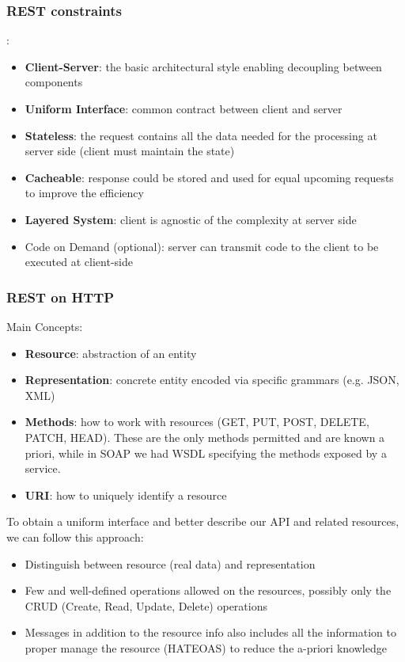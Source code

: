 \documentclass[10pt,a4paper]{article}
\begin{document}
\subsubsection{REST constraints}:
\begin{itemize}
	\item \textbf{Client-Server}: the basic architectural style enabling decoupling between components
	\item \textbf{Uniform Interface}: common contract between client and server
	\item \textbf{Stateless}: the request contains all the data needed for the processing at server side (client must maintain the state)
	\item \textbf{Cacheable}: response could be stored and used for equal upcoming requests to improve the efficiency
	\item \textbf{Layered System}: client is agnostic of the complexity at server side
	\item Code on Demand (optional): server can transmit code to the client to be executed at client-side
\end{itemize}
\subsubsection{REST on HTTP}
Main Concepts:
\begin{itemize}
	\item \textbf{Resource}: abstraction of an entity
	\item \textbf{Representation}: concrete entity encoded via specific grammars (e.g. JSON, XML)
	\item \textbf{Methods}: how to work with resources (GET, PUT, POST, DELETE, PATCH, HEAD). These are the only methods permitted and are known a priori, while in SOAP we had WSDL specifying the methods exposed by a service.
	\item \textbf{URI}: how to uniquely identify a resource
\end{itemize}
To obtain a uniform interface and better describe our API and related resources, we can follow this approach:
\begin{itemize}
	\item Distinguish between resource (real data) and representation
	\item Few and well-defined operations allowed on the resources, possibly only the CRUD (Create, Read, Update, Delete) operations
	\item Messages in addition to the resource info also includes all the information to proper manage the resource (HATEOAS) to reduce the a-priori knowledge
\end{itemize}
\end{document}
